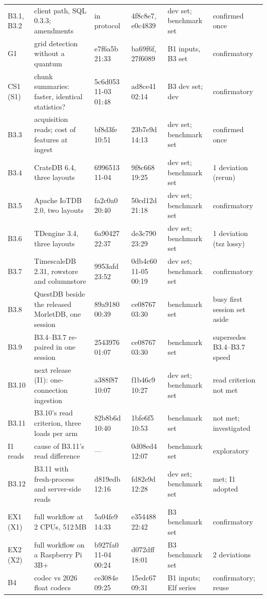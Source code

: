 \documentclass[sigconf,nonacm]{acmart}
\newcommand{\M}{MorletDB}
\begin{document}
\begin{table}[h]
\begin{tabularx}{\textwidth}{@{}l>{\raggedright\arraybackslash}Xllll@{}}
B3.1, B3.2 & client path, SQL 0.3.3; amendments & in protocol & 4f8c8e7, e0c4839 & dev set; benchmark set & confirmed once \\
G1 & grid detection without a quantum & e7f6a5b 21:33 & ba69f6f, 27f6089 & B1 inputs, B3 set & confirmatory \\
CS1 (S1) & chunk summaries: faster, identical statistics? & 5c6d053 11-03 01:48 & ad8ce41 02:14 & B3 dev set; dev & confirmatory \\
B3.3 & acquisition reads; cost of features at ingest & bf8d3fe 10:51 & 23b7e9d 14:13 & dev set; benchmark set & confirmed once \\
B3.4 & CrateDB 6.4, three layouts & 6996513 11-04 & 9f8c668 19:25 & dev set; benchmark set & 1 deviation (rerun) \\
B3.5 & Apache IoTDB 2.0, two layouts & fa2c0a0 20:40 & 50cd12d 21:18 & dev set; benchmark set & confirmatory \\
B3.6 & TDengine 3.4, three layouts & 6a90427 22:37 & de3c790 23:29 & dev set; benchmark set & 1 deviation (tsz lossy) \\
B3.7 & TimescaleDB 2.31, rowstore and columnstore & 9953afd 23:52 & 0db4c60 11-05 00:19 & dev set; benchmark set & confirmatory \\
B3.8 & QuestDB beside the released \M{}, one session & 89a9180 00:39 & ce08767 03:30 & benchmark set & busy first session set aside \\
B3.9 & B3.4--B3.7 re-paired in one session & 2543976 01:07 & ce08767 03:30 & benchmark set & supersedes B3.4--B3.7 speed \\
B3.10 & next release (I1): one-connection ingestion & a388f87 10:07 & f1b46c9 10:27 & dev set; benchmark set & read criterion not met \\
B3.11 & B3.10's read criterion, three loads per arm & 82b8b6d 10:40 & 1bfe6f5 10:53 & benchmark set & not met; investigated \\
I1 reads & cause of B3.11's read difference & --- & 0d08ed4 12:07 & benchmark set & exploratory \\
B3.12 & B3.11 with fresh-process and server-side reads & d819edb 12:16 & fd82e9d 12:28 & dev set; benchmark set & met; I1 adopted \\
EX1 (X1) & full workflow at 2 CPUs, 512\,MB & 5a04fe9 14:33 & e354488 22:42 & B3 benchmark set & confirmatory \\
EX2 (X2) & full workflow on a Raspberry Pi 3B+ & b927fa0 11-04 00:24 & d072dff 18:01 & B3 benchmark set & 2 deviations \\
B4 & codec vs 2026 float codecs & ce3084e 09:25 & 15edc67 09:31 & B1 inputs; Elf series & confirmatory; reuse \\
\bottomrule
\end{tabularx}
\end{table}
\end{document}
